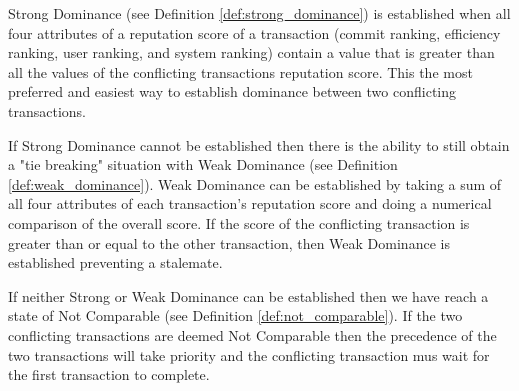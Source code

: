 Strong Dominance (see Definition \ref{def:strong_dominance}) is established when all four attributes of a reputation score of a transaction (commit ranking, efficiency ranking, user ranking, and system ranking) contain a value that is greater than all the values of the conflicting transactions reputation score. This the most preferred and easiest way to establish dominance between two conflicting transactions.

If Strong Dominance cannot be established then there is the ability to still obtain a "tie breaking" situation with Weak Dominance (see Definition \ref{def:weak_dominance}). Weak Dominance can be established by taking a sum of all four attributes of each transaction's reputation score and doing a numerical comparison of the overall score. If the score of the conflicting transaction is greater than or equal to the other transaction, then Weak Dominance is established preventing a stalemate.

If neither Strong or Weak Dominance can be established then we have reach a state of Not Comparable (see Definition \ref{def:not_comparable}). If the two conflicting transactions are deemed Not Comparable then the precedence of the two transactions will take priority and the conflicting transaction mus wait for the first transaction to complete.





